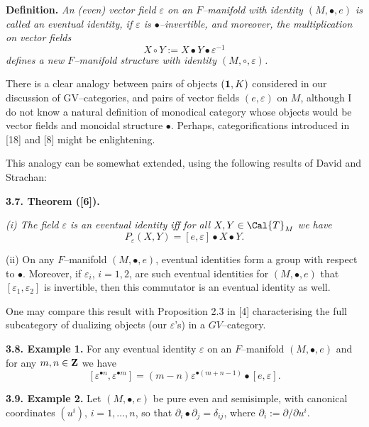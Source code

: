 {{\bf Definition.} {\it An (even) vector field $\varepsilon$ on
an $F$--manifold with identity $(M,\bullet , e)$ is called
an eventual identity,
if $\varepsilon$ is $\bullet$--invertible, and moreover, the multiplication 
on vector fields
$$
X\circ Y:= X\bullet Y\bullet  \varepsilon^{-1}
$$
defines a new $F$--manifold structure with identity $(M, \circ , \varepsilon )$.}

\smallskip

There is a clear analogy between pairs of objects $(\bold{1}, K)$ considered in our discussion of 
GV--categories, and pairs of vector fields $(e,\varepsilon )$ on $M$, although
I do not know a natural definition of monodical category whose objects would be vector fields
and monoidal structure $\bullet$.
Perhaps, categorifications introduced in [18] and [8] might be
enlightening.


\smallskip

This analogy can be somewhat extended, using the following results of David and Strachan:

\medskip

{\bf 3.7. Theorem ([6]).} {\it (i) The field $\varepsilon$ is an eventual identity iff
for all $X,Y\in \Cal{T}_M$ we have
$$
P_{\varepsilon}(X,Y)= [e,\varepsilon ]\bullet X\bullet Y .
$$

(ii) On any $F$--manifold $(M,\bullet, e)$,
eventual identities form a group 
with respect to $\bullet$.
\smallskip
Moreover, if $\varepsilon_i$, $i=1,2$, are such eventual identities for  $(M,\bullet, e)$
that $[\varepsilon_1, \varepsilon_2]$ is invertible, 
then this commutator
is an eventual identity as well.}

\medskip

One may compare this result with Proposition 2.3 in [4] characterising the full
subcategory of dualizing objects (our $\varepsilon$'s) in a $GV$--category.

\bigskip

{\bf 3.8. Example 1.} For any eventual identity $\varepsilon$ on an $F$--manifold $(M,\bullet , e)$
and for any $m,n\in \bold{Z}$ we have
$$
[\varepsilon ^{\bullet n}, \varepsilon ^{\bullet m}] = (m-n)\varepsilon ^{\bullet (m+ n-1)}\bullet [e,\varepsilon ] .
$$

\bigskip

{\bf 3.9. Example 2.}  Let $(M,\bullet, e)$ be pure even and semisimple, with canonical
coordinates 
$(u^i)$, $i=1,\dots ,n$,  
so that  $\partial_i\bullet\partial_j=\delta_{ij}$,
where $\partial_i:=\partial/\partial u^i$.

}
